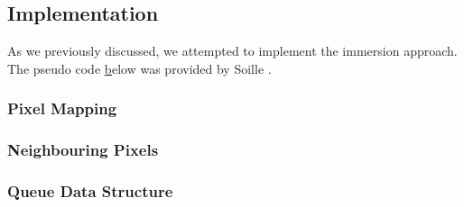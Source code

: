 \documentclass{article}
\begin{document}
\subsection{Implementation}
As we previously discussed, we attempted to implement the immersion approach. The pseudo code \href{alg:immersion_alg} below was provided by Soille \cite{soilletextbook}.
\newline

\subsubsection{Pixel Mapping}
\subsubsection{Neighbouring Pixels}
\subsubsection{Queue Data Structure}

\newpage

\vspace*{-3cm}
\end{document}

